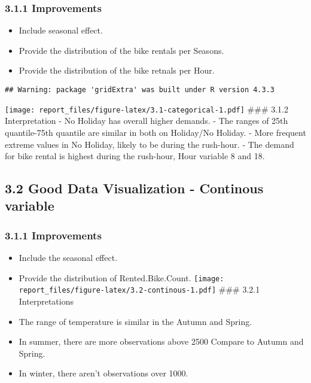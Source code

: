 \documentclass[
]{article}
\providecommand{\tightlist}{%
  \setlength{\itemsep}{0pt}\setlength{\parskip}{0pt}}
\begin{document}
\hypertarget{improvements}{%
\subsubsection{3.1.1 Improvements}\label{improvements}}

\begin{itemize}
\tightlist
\item
  Include seasonal effect.
\item
  Provide the distribution of the bike rentals per Seasons.
\item
  Provide the distribution of the bike retnals per Hour.
\end{itemize}

\begin{verbatim}
## Warning: package 'gridExtra' was built under R version 4.3.3
\end{verbatim}

\texttt{[image: report\_files/figure-latex/3.1-categorical-1.pdf]} \#\#\#
3.1.2 Interpretation - No Holiday has overall higher demands. - The
ranges of 25th quantile-75th quantile are similar in both on Holiday/No
Holiday. - More frequent extreme values in No Holiday, likely to be
during the rush-hour. - The demand for bike rental is highest during the
rush-hour, Hour variable 8 and 18.

\hypertarget{good-data-visualization---continous-variable}{%
\subsection{3.2 Good Data Visualization - Continous
variable}\label{good-data-visualization---continous-variable}}

\hypertarget{improvements-1}{%
\subsubsection{3.1.1 Improvements}\label{improvements-1}}

\begin{itemize}
\tightlist
\item
  Include the seasonal effect.
\item
  Provide the distribution of Rented.Bike.Count.
  \texttt{[image: report\_files/figure-latex/3.2-continous-1.pdf]} \#\#\#
  3.2.1 Interpretations
\item
  The range of temperature is similar in the Autumn and Spring.
\item
  In summer, there are more observations above 2500 Compare to Autumn
  and Spring.
\item
  In winter, there aren't observations over 1000.
\end{itemize}
\end{document}
